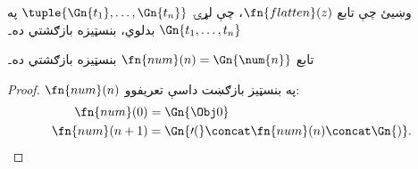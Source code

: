 \documentclass[../../../include/open-logic-section]{subfiles}
\begin{document}
\begin{prob}
وښيئ چې تابع $\fn{flatten}(z)$، چې لړۍ
$\tuple{\Gn{t_1}, \dots, \Gn{t_n}}$ په $\Gn{t_1, \dots, t_n}$
بدلوي، بنسټيزه بازګشتي ده۔
\end{prob}

\begin{prop}
  تابع $\fn{num}(n) = \Gn{\num{n}}$ بنسټيزه بازګشتي ده۔
\end{prop}

\begin{proof}
  $\fn{num}(n)$ په بنسټيز بازګښت داسې تعريفوو:
  \begin{align*}
    \fn{num}(0) & = \Gn{\Obj 0}\\
    \fn{num}(n+1) & = \Gn{\prime(} \concat \fn{num}(n) \concat \Gn{)}.
  \end{align*}
\end{proof}
\end{document}
